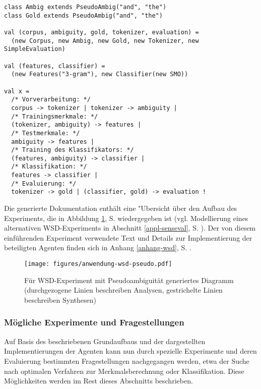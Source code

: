 \documentclass[abstracton, 12pt]{scrartcl}
\begin{document}
\begin{lstlisting}[float, label=code-wsd-pseudo, caption={WSD-Experiment mit Pseudoambiguit"at}]
class Ambig extends PseudoAmbig("and", "the")
class Gold extends PseudoAmbig("and", "the")

val (corpus, ambiguity, gold, tokenizer, evaluation) = 
  (new Corpus, new Ambig, new Gold, new Tokenizer, new SimpleEvaluation)
   
val (features, classifier) = 
  (new Features("3-gram"), new Classifier(new SMO))
   
val x =
  /* Vorverarbeitung: */
  corpus -> tokenizer | tokenizer -> ambiguity |
  /* Trainingsmerkmale: */
  (tokenizer, ambiguity) -> features | 
  /* Testmerkmale: */
  ambiguity -> features |
  /* Training des Klassifikators: */
  (features, ambiguity) -> classifier | 
  /* Klassifikation: */
  features -> classifier | 
  /* Evaluierung: */
  tokenizer -> gold | (classifier, gold) -> evaluation !
\end{lstlisting}

Die generierte Dokumentation enthält eine "Ubersicht über den Aufbau des Experiments, die in Abbildung \ref{anwendung-wsd-pseudo}, S. \pageref{anwendung-wsd-pseudo} wiedergegeben ist (vgl. Modellierung eines alternativen WSD-Experiments in Abschnitt \ref{appl-senseval}, S. \pageref{appl-senseval}). Der von diesem einführenden Experiment verwendete Text und Details zur Implementierung der beteiligten Agenten finden sich in Anhang \ref{anhang-wsd}, S. \pageref{anhang-wsd}.

\begin{figure}
\begin{center}
  \texttt{[image: figures/anwendung-wsd-pseudo.pdf]}
  \caption[Für WSD-Experiment mit Pseudoambiguität generiertes Diagramm]{Für WSD-Experiment mit Pseudoambiguität generiertes Diagramm (durchgezogene Linien beschreiben Analysen, gestrichelte Linien beschreiben Synthesen)}
  \label{anwendung-wsd-pseudo}
\end{center}
\end{figure}

\subsubsection{Mögliche Experimente und Fragestellungen} \label{appl-pseudoeval-results}

Auf Basis des beschriebenen Grundaufbaus und der dargestellten Implementierungen der Agenten kann nun durch spezielle Experimente und deren Evaluierung bestimmten Fragestellungen nachgegangen werden, etwa der Suche nach optimalen Verfahren zur Merkmalsberechnung oder Klassifikation. Diese Möglichkeiten werden im Rest dieses Abschnitts beschrieben.
\end{document}
